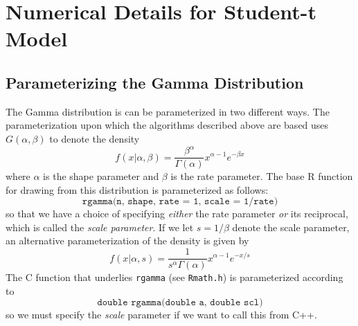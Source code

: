\documentclass[12pt]{article}
\begin{document}
\section{Numerical Details for Student-t Model}

\subsection{Parameterizing the Gamma Distribution}
The Gamma distribution is can be parameterized in two different ways. 
The parameterization upon which the algorithms described above are based uses $G(\alpha,\beta)$ to denote the density 
\begin{equation*}
  f(x|\alpha,\beta) = \frac{\beta^\alpha}{\Gamma(\alpha)}x^{\alpha-1}e^{-\beta x}
\end{equation*}
where $\alpha$ is the shape parameter and $\beta$ is the rate parameter.
The base R function for drawing from this distribution is parameterized as follows:
\begin{equation*}
  \texttt{rgamma(n, shape, rate = 1, scale = 1/rate)}
\end{equation*}
so that we have a choice of specifying \emph{either} the rate parameter \emph{or} its reciprocal, which is called the \emph{scale parameter}.
If we let $s = 1/\beta$ denote the scale parameter, an alternative parameterization of the density is given by
\begin{equation*}
  f(x|\alpha,s)= \frac{1}{s^{\alpha} \Gamma(\alpha)} x^{\alpha-1} e^{-x/s}
\end{equation*}
The C function that underlies \texttt{rgamma} (see \texttt{Rmath.h}) is parameterized according to
\begin{equation*}
  \texttt{double rgamma(double a, double scl)}
\end{equation*}
so we must specify the \emph{scale} parameter if we want to call this from C++.
\end{document}
